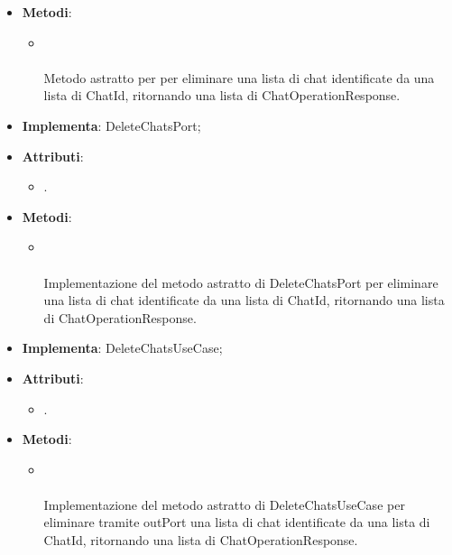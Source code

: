 \documentclass[10pt, a4paper]{article}
\begin{document}
\label{DeleteChatsPortDettaglio}
\begin{itemize}
    \item \textbf{Metodi}:
    \begin{itemize}
        \item {}\\ \\
        Metodo astratto per per eliminare una lista di chat identificate da una lista di ChatId, ritornando una lista di ChatOperationResponse.
    \end{itemize}
\end{itemize}


\label{DeleteChatsPostgresDettaglio}
\begin{itemize}
    \item \textbf{Implementa}: DeleteChatsPort;
    \item \textbf{Attributi}:
    \begin{itemize}
        \item {}.
    \end{itemize}
    \item \textbf{Metodi}:
    \begin{itemize}
        \item {}\\ \\
        Implementazione del metodo astratto di DeleteChatsPort per eliminare una lista di chat identificate da una lista di ChatId, ritornando una lista di ChatOperationResponse.
    \end{itemize}
\end{itemize}

\label{DeleteChatsServiceDettaglio}
\begin{itemize}
    \item \textbf{Implementa}: DeleteChatsUseCase;
    \item \textbf{Attributi}:
    \begin{itemize}
        \item {}.
    \end{itemize}
    \item \textbf{Metodi}:
    \begin{itemize}
        \item {}\\ \\
        Implementazione del metodo astratto di DeleteChatsUseCase per eliminare tramite outPort una lista di chat identificate da una lista di ChatId, ritornando una lista di ChatOperationResponse.
    \end{itemize}
\end{itemize}
\end{document}
